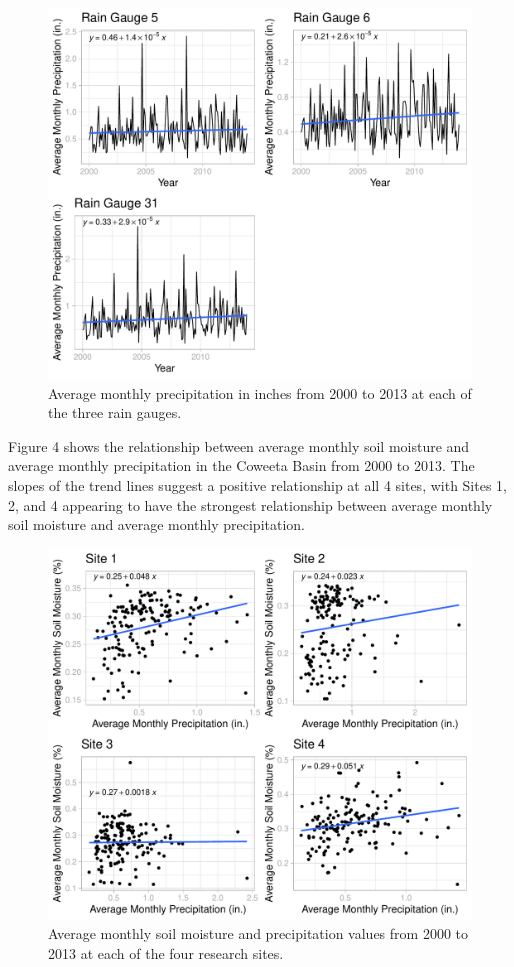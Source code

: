 \documentclass[
  12pt,
]{article}
\begin{document}
\begin{figure}
\centering
\includegraphics{Project_Template_files/figure-latex/Average Monthly Precipitation Cowplot-1.pdf}
\caption{Average monthly precipitation in inches from 2000 to 2013 at
each of the three rain gauges.}
\end{figure}

\newpage

Figure 4 shows the relationship between average monthly soil moisture
and average monthly precipitation in the Coweeta Basin from 2000 to
2013. The slopes of the trend lines suggest a positive relationship at
all 4 sites, with Sites 1, 2, and 4 appearing to have the strongest
relationship between average monthly soil moisture and average monthly
precipitation.

\begin{figure}
\centering
\includegraphics{Project_Template_files/figure-latex/Average Monthly Soil Moisture and Precipitation Cowplot-1.pdf}
\caption{Average monthly soil moisture and precipitation values from
2000 to 2013 at each of the four research sites.}
\end{figure}
\end{document}
